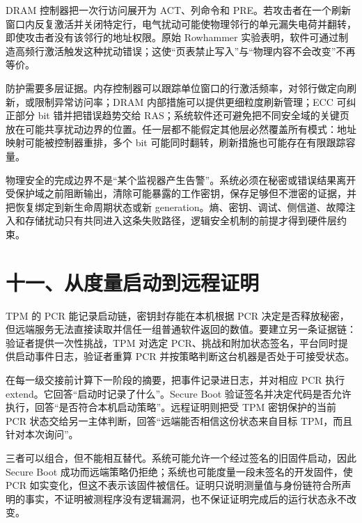 
DRAM 控制器把一次行访问展开为 ACT、列命令和 PRE。若攻击者在一个刷新窗口内反复激活并关闭特定行，电气扰动可能使物理邻行的单元漏失电荷并翻转，即使攻击者没有该邻行的地址权限。原始 Rowhammer 实验表明，软件可通过制造高频行激活触发这种扰动错误；这使“页表禁止写入”与“物理内容不会改变”不再等价。\cite{rowhammer-isca}

防护需要多层证据。内存控制器可以跟踪单位窗口的行激活频率，对邻行做定向刷新，或限制异常访问率；DRAM 内部措施可以提供更细粒度刷新管理；ECC 可纠正部分 bit 错并把错误趋势交给 RAS；系统软件还可避免把不同安全域的关键页放在可能共享扰动边界的位置。任一层都不能假定其他层必然覆盖所有模式：地址映射可能被控制器重排，多个 bit 可能同时翻转，刷新措施也可能存在有限跟踪容量。

物理安全的完成边界不是“某个监视器产生告警”。系统必须在秘密或错误结果离开受保护域之前阻断输出，清除可能暴露的工作密钥，保存足够但不泄密的证据，并把恢复绑定到新生命周期状态或新 generation。熵、密钥、调试、侧信道、故障注入和存储扰动只有共同进入这条失败路径，逻辑安全机制的前提才得到硬件层约束。
\section{十一、从度量启动到远程证明}

TPM 的 PCR 能记录启动链，密钥封存能在本机根据 PCR 决定是否释放秘密，但远端服务无法直接读取并信任一组普通软件返回的数值。要建立另一条证据链：验证者提供一次性挑战，TPM 对选定 PCR、挑战和附加状态签名，平台同时提供启动事件日志，验证者重算 PCR 并按策略判断这台机器是否处于可接受状态。\cite{tpm20-architecture}


在每一级交接前计算下一阶段的摘要，把事件记录进日志，并对相应 PCR 执行 extend。它回答“启动时记录了什么”。Secure Boot 验证签名并决定代码是否允许执行，回答“是否符合本机启动策略”。远程证明则把受 TPM 密钥保护的当前 PCR 状态交给另一主体判断，回答“远端能否相信这份状态来自目标 TPM，而且针对本次询问”。

三者可以组合，但不能相互替代。系统可能允许一个经过签名的旧固件启动，因此 Secure Boot 成功而远端策略仍拒绝；系统也可能度量一段未签名的开发固件，使 PCR 如实变化，但这不表示该固件被信任。证明只说明测量值与身份链符合所声明的事实，不证明被测程序没有逻辑漏洞，也不保证证明完成后的运行状态永不改变。


